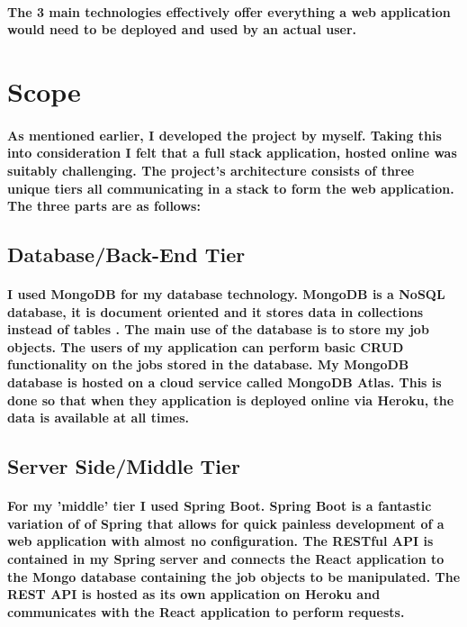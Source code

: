 \paragraph{The 3 main technologies effectively offer everything a web application would need to be deployed and used by an actual user.}

\section{Scope}
\paragraph{As mentioned earlier, I developed the project by myself. Taking this into consideration I felt that a full stack application, hosted online was suitably challenging. The project's architecture consists of three unique tiers all communicating in a stack to form the web application. The three parts are as follows: }

\subsection{Database/Back-End Tier}
\paragraph{I used MongoDB for my database technology. MongoDB is a NoSQL database, it is document oriented and it stores data in collections instead of tables \cite{parker2013comparing}. The main use of the database is to store my job objects. The users of my application can perform basic CRUD functionality on the jobs stored in the database. My MongoDB database is hosted on a cloud service called MongoDB Atlas. This is done so that when they application is deployed online via Heroku, the data is available at all times.}

\subsection{Server Side/Middle Tier}
\paragraph{For my 'middle' tier I used Spring Boot. Spring Boot is a fantastic variation of of Spring that allows for quick painless development of a web application with almost no configuration. The RESTful API is contained in my Spring server and connects the React application to the Mongo database containing the job objects to be manipulated. The REST API is hosted as its own application on Heroku and communicates with the React application to perform requests.}
